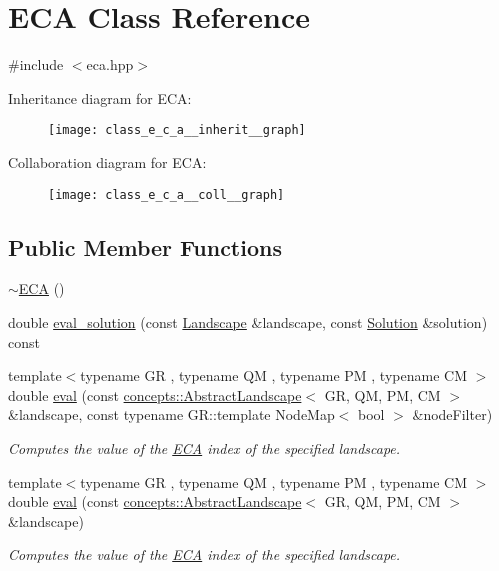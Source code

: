 \hypertarget{class_e_c_a}{}\section{E\+CA Class Reference}
\label{class_e_c_a}


{\ttfamily \#include $<$eca.\+hpp$>$}



Inheritance diagram for E\+CA\+:\nopagebreak
\begin{figure}[H]
\begin{center}
\leavevmode
\texttt{[image: class\_e\_c\_a\_\_inherit\_\_graph]}
\end{center}
\end{figure}


Collaboration diagram for E\+CA\+:\nopagebreak
\begin{figure}[H]
\begin{center}
\leavevmode
\texttt{[image: class\_e\_c\_a\_\_coll\_\_graph]}
\end{center}
\end{figure}
\subsection*{Public Member Functions}
\begin{DoxyCompactItemize}
\item 
\hyperlink{class_e_c_a_acc7762273f9df84a3457c8c9b4e58a31}{$\sim$\+E\+CA} ()
\item 
double \hyperlink{class_e_c_a_ae4d2665232d2ff83b3f04f812c45c172}{eval\+\_\+solution} (const \hyperlink{class_landscape}{Landscape} \&landscape, const \hyperlink{class_solution}{Solution} \&solution) const
\item 
{\footnotesize template$<$typename GR , typename QM , typename PM , typename CM $>$ }\\double \hyperlink{class_e_c_a_af8127c6291b457b8c7033f23d1656767}{eval} (const \hyperlink{classconcepts_1_1_abstract_landscape}{concepts\+::\+Abstract\+Landscape}$<$ GR, QM, PM, CM $>$ \&landscape, const typename G\+R\+::template Node\+Map$<$ bool $>$ \&node\+Filter)
\begin{DoxyCompactList}\small\item\em Computes the value of the \hyperlink{class_e_c_a}{E\+CA} index of the specified landscape. \end{DoxyCompactList}\item 
{\footnotesize template$<$typename GR , typename QM , typename PM , typename CM $>$ }\\double \hyperlink{class_e_c_a_ab6556319590259a816cf176e933746d7}{eval} (const \hyperlink{classconcepts_1_1_abstract_landscape}{concepts\+::\+Abstract\+Landscape}$<$ GR, QM, PM, CM $>$ \&landscape)
\begin{DoxyCompactList}\small\item\em Computes the value of the \hyperlink{class_e_c_a}{E\+CA} index of the specified landscape. \end{DoxyCompactList}\end{DoxyCompactItemize}
